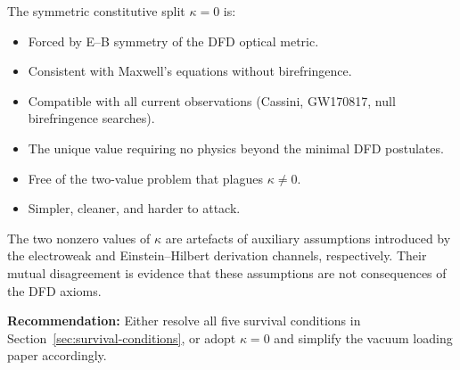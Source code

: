 \documentclass[12pt,a4paper]{article}
\theoremstyle{definition}
\theoremstyle{remark}
\begin{document}
\begin{tcolorbox}[colback=blue!5!white, colframe=blue!60!black, title=Bottom Line]
The symmetric constitutive split $\kappa = 0$ is:
\begin{itemize}
\item Forced by E--B symmetry of the DFD optical metric.
\item Consistent with Maxwell's equations without birefringence.
\item Compatible with all current observations (Cassini, GW170817,
  null birefringence searches).
\item The unique value requiring no physics beyond the minimal DFD
  postulates.
\item Free of the two-value problem that plagues $\kappa \neq 0$.
\item Simpler, cleaner, and harder to attack.
\end{itemize}

The two nonzero values of $\kappa$ are artefacts of auxiliary
assumptions introduced by the electroweak and Einstein--Hilbert
derivation channels, respectively.  Their mutual disagreement is
evidence that these assumptions are not consequences of the DFD axioms.

\textbf{Recommendation:} Either resolve all five survival conditions
in Section~\ref{sec:survival-conditions}, or adopt $\kappa = 0$ and
simplify the vacuum loading paper accordingly.
\end{tcolorbox}
\end{document}
